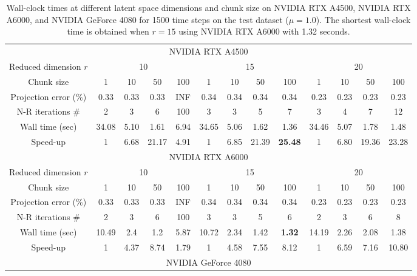 \begin{table}[!ht]
    \caption[Wall-clock times on multiple GPUs.]{Wall-clock times at different latent space dimensions and chunk size on NVIDIA RTX A4500, NVIDIA RTX A6000, and NVIDIA GeForce 4080 for 1500 time steps on the test dataset ($\mu = 1.0$). The shortest wall-clock time is obtained when $r = 15$ using NVIDIA RTX A6000 with 1.32 seconds.}
    \label{Tab:A4500}
    \begin{center}
        \small
    \begin{tabular}{|c|c|c|c|c|c|c|c|c|c|c|c|c|}
    \hline
    \multicolumn{13}{|c|}{NVIDIA RTX A4500} \\ \cline{1-13}
    Reduced dimension $r$ & \multicolumn{4}{|c|}{10} & \multicolumn{4}{|c|}{15} & \multicolumn{4}{|c|}{20}\\ \hline
    Chunk size & 1 & 10 & 50 & 100 & 1 & 10 & 50 & 100 & 1 & 10 & 50 & 100 \\ \hline
    Projection error (\%) & 0.33 & 0.33 & 0.33 & INF & 0.34 & 0.34 & 0.34 & 0.34 & 0.23 & 0.23 & 0.23 & 0.23 \\ \hline
    N-R iterations $\#$ & 2 & 3 & 6 & 100 & 3 & 3 & 5 & 7 & 3 & 4 & 7 & 12 \\ \hline
    Wall time (sec) & 34.08 & 5.10 & 1.61 & 6.94 & 34.65 & 5.06 & 1.62 & 1.36 & 34.46 & 5.07 & 1.78 & 1.48 \\ \hline 
    Speed-up & 1 & 6.68 & 21.17 & 4.91 & 1 & 6.85 & 21.39 & \textbf{25.48} & 1 & 6.80 & 19.36 & 23.28 \\ \hline
    \multicolumn{13}{|c|}{NVIDIA RTX A6000} \\ \cline{1-13}
    Reduced dimension $r$ &\multicolumn{4}{|c|}{10} & \multicolumn{4}{|c|}{15} & \multicolumn{4}{|c|}{20}\\ \hline
    Chunk size & 1 & 10 & 50 & 100 & 1 & 10 & 50 & 100 & 1 & 10 & 50 & 100 \\ \hline
    Projection error (\%) & 0.33 & 0.33 & 0.33 & INF & 0.34 & 0.34 & 0.34 & 0.34 & 0.23 & 0.23 & 0.23 & 0.23 \\ \hline
    N-R iterations $\#$ & 2 & 3 & 6 & 100 & 3 & 3 & 5 & 6 & 2 & 3 & 6 & 8 \\ \hline 
    Wall time (sec) & 10.49 & 2.4 & 1.2 & 5.87 & 10.72 & 2.34 & 1.42 & \textbf{1.32} & 14.19 & 2.26 & 2.08 & 1.38 \\ \hline 
    Speed-up & 1 & 4.37 & 8.74 & 1.79 & 1 & 4.58 & 7.55 & 8.12 & 1 & 6.59 & 7.16 & 10.80 \\ \hline
    \multicolumn{13}{|c|}{NVIDIA GeForce 4080} \\ \cline{1-13}

\end{tabular}
\end{center}
\end{table}
